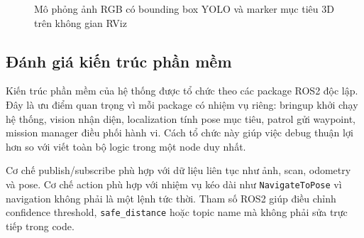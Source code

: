 \begin{figure}[H]
\centering
{}
\caption{Mô phỏng ảnh RGB có bounding box YOLO và marker mục tiêu 3D trên không gian RViz}
\label{fig:yolo-rviz-marker-evaluation}
\end{figure}

\subsection{Đánh giá kiến trúc phần mềm}
\label{subsec:software-architecture-evaluation}

Kiến trúc phần mềm của hệ thống được tổ chức theo các package ROS2 độc lập. Đây là ưu điểm quan trọng vì mỗi package có nhiệm vụ riêng: bringup khởi chạy hệ thống, vision nhận diện, localization tính pose mục tiêu, patrol gửi waypoint, mission manager điều phối hành vi. Cách tổ chức này giúp việc debug thuận lợi hơn so với viết toàn bộ logic trong một node duy nhất.

Cơ chế publish/subscribe phù hợp với dữ liệu liên tục như ảnh, scan, odometry và pose. Cơ chế action phù hợp với nhiệm vụ kéo dài như \texttt{NavigateToPose} vì navigation không phải là một lệnh tức thời. Tham số ROS2 giúp điều chỉnh confidence threshold, \texttt{safe\_distance} hoặc topic name mà không phải sửa trực tiếp trong code.


